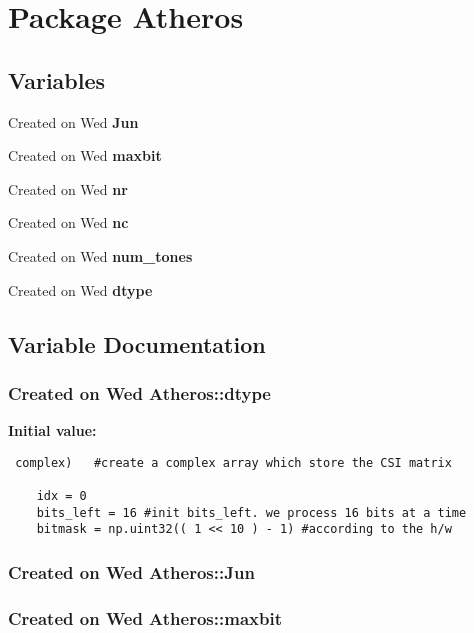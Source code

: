 \section{Package Atheros}
\label{namespaceAtheros}


\subsection*{Variables}
\begin{CompactItemize}
\item 
Created on Wed {\bf Jun}
\item 
Created on Wed {\bf maxbit}
\item 
Created on Wed {\bf nr}
\item 
Created on Wed {\bf nc}
\item 
Created on Wed {\bf num\_\-tones}
\item 
Created on Wed {\bf dtype}
\end{CompactItemize}


\subsection{Variable Documentation}
\subsubsection{\setlength{\rightskip}{0pt plus 5cm}Created on Wed Atheros::dtype}\label{namespaceAtheros_a5}


{\bf Initial value:}

\footnotesize\begin{verbatim} complex)   #create a complex array which store the CSI matrix
    
    idx = 0   
    bits_left = 16 #init bits_left. we process 16 bits at a time
    bitmask = np.uint32(( 1 << 10 ) - 1) #according to the h/w\end{verbatim}\normalsize 
{}
\subsubsection{\setlength{\rightskip}{0pt plus 5cm}Created on Wed Atheros::Jun}\label{namespaceAtheros_a0}


\subsubsection{\setlength{\rightskip}{0pt plus 5cm}Created on Wed Atheros::maxbit}\label{namespaceAtheros_a1}


